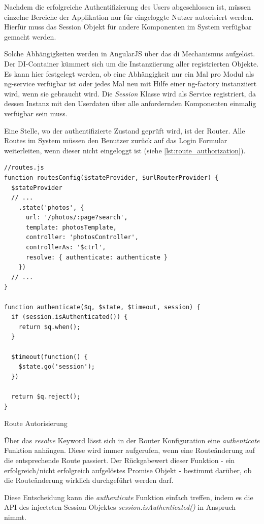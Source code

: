 Nachdem die erfolgreiche Authentifizierung des Users abgeschlossen ist, müssen einzelne Bereiche der Applikation nur für eingeloggte Nutzer autorisiert werden. Hierfür muss das Session Objekt für andere Komponenten im System verfügbar gemacht werden.

Solche Abhängigkeiten werden in AngularJS über das \gls{di} Mechanismus aufgelöst. Der DI-Con­tai­ner kümmert sich um die Instanziierung aller registrierten Objekte. Es kann hier festgelegt werden, ob eine Abhängigkeit nur ein Mal pro Modul als \gls{ng-service} verfügbar ist oder jedes Mal neu mit Hilfe einer \gls{ng-factory} instanziiert wird, wenn sie gebraucht wird.
Die \textit{Session} Klasse wird als Service registriert, da dessen Instanz mit den Userdaten über alle anfordernden Komponenten einmalig verfügbar sein muss.

Eine Stelle, wo der authentifizierte Zustand geprüft wird, ist der Router. Alle Routes im System müssen den Benutzer zurück auf das Login Formular weiterleiten, wenn dieser nicht eingeloggt ist (siehe \ref{lst:route_authorization}).

\begin{listing}[H]
\begin{verbatim}
//routes.js
function routesConfig($stateProvider, $urlRouterProvider) {
  $stateProvider
  // ...
    .state('photos', {
      url: '/photos/:page?search',
      template: photosTemplate,
      controller: 'photosController',
      controllerAs: '$ctrl',
      resolve: { authenticate: authenticate }
    })
  // ...
}

function authenticate($q, $state, $timeout, session) {
  if (session.isAuthenticated()) {
    return $q.when();
  }

  $timeout(function() {
    $state.go('session');
  })

  return $q.reject();
}

\end{verbatim}
\caption{Route Autorisierung}
\label{lst:route_authorization}
\end{listing}

Über das \textit{resolve} Keyword lässt sich in der Router Konfiguration eine \textit{authenticate} Funktion anhängen. Diese wird immer aufgerufen, wenn eine Routeänderung auf die entsprechende Route passiert. Der Rückgabewert dieser Funktion - ein erfolgreich/nicht erfolgreich aufgelöstes Promise Objekt - bestimmt darüber, ob die Routeänderung wirklich durchgeführt werden darf.

Diese Entscheidung kann die \textit{authenticate} Funktion einfach treffen, indem es die API des injecteten Session Objektes \textit{session.isAuthenticated()} in Anspruch nimmt.

